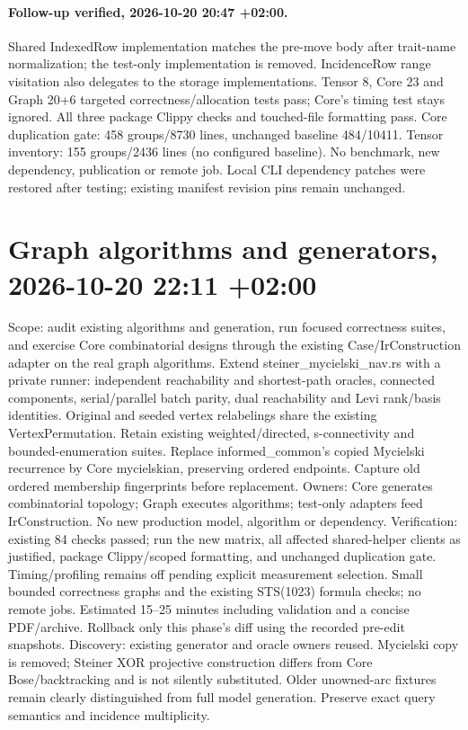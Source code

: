 \documentclass[11pt,a4paper]{article}
\begin{document}
\paragraph{Follow-up verified, 2026-10-20 20:47 +02:00.}
Shared IndexedRow implementation matches the pre-move body after trait-name
normalization; the test-only implementation is removed. IncidenceRow range
visitation also delegates to the storage implementations. Tensor 8, Core 23 and
Graph 20+6 targeted correctness/allocation tests pass; Core's timing test stays
ignored. All three package Clippy checks and touched-file formatting pass.
Core duplication gate: 458 groups/8730 lines, unchanged baseline 484/10411.
Tensor inventory: 155 groups/2436 lines (no configured baseline). No benchmark,
new dependency, publication or remote job. Local CLI dependency patches were
restored after testing; existing manifest revision pins remain unchanged.
\section*{Graph algorithms and generators, 2026-10-20 22:11 +02:00}
Scope: audit existing algorithms and generation, run focused correctness suites,
and exercise Core combinatorial designs through the existing Case/IrConstruction
adapter on the real graph algorithms. Extend steiner\_mycielski\_nav.rs with a private
runner: independent reachability and shortest-path oracles, connected components,
serial/parallel batch parity, dual reachability and Levi rank/basis identities.
Original and seeded vertex relabelings share the existing VertexPermutation.
Retain existing weighted/directed, s-connectivity and bounded-enumeration suites.
Replace informed\_common's copied Mycielski recurrence by Core mycielskian, preserving
ordered endpoints. Capture old ordered membership fingerprints before replacement.
Owners: Core generates combinatorial topology; Graph executes algorithms; test-only
adapters feed IrConstruction. No new production model, algorithm or dependency.
Verification: existing 84 checks passed; run the new matrix, all affected shared-helper
clients as justified, package Clippy/scoped formatting, and unchanged duplication gate.
Timing/profiling remains off pending explicit measurement selection. Small bounded
correctness graphs and the existing STS(1023) formula checks; no remote jobs.
Estimated 15--25 minutes including validation and a concise PDF/archive. Rollback
only this phase's diff using the recorded pre-edit snapshots.
Discovery: existing generator and oracle owners reused. Mycielski copy is removed;
Steiner XOR projective construction differs from Core Bose/backtracking and is not
silently substituted. Older unowned-arc fixtures remain clearly distinguished from
full model generation. Preserve exact query semantics and incidence multiplicity.
\end{document}
